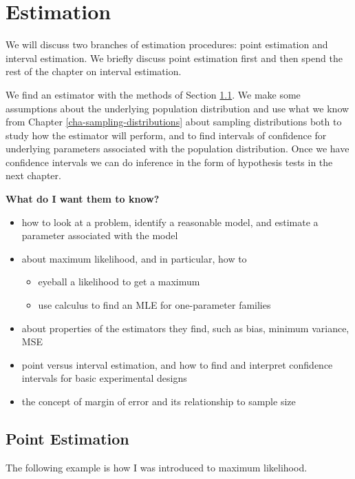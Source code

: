 \documentclass[]{book}
\providecommand{\tightlist}{%
  \setlength{\itemsep}{0pt}\setlength{\parskip}{0pt}}
\numberwithin{equation}{chapter}
\numberwithin{figure}{chapter}
\theoremstyle{plain}
\theoremstyle{definition}
\theoremstyle{remark}
\theoremstyle{definition}
\theoremstyle{definition}
\theoremstyle{remark}
\begin{document}
\chapter{Estimation}\label{cha-estimation}

We will discuss two branches of estimation procedures: point estimation
and interval estimation. We briefly discuss point estimation first and
then spend the rest of the chapter on interval estimation.

We find an estimator with the methods of Section
\ref{sec-point-estimation}. We make some assumptions about the
underlying population distribution and use what we know from Chapter
\ref{cha-sampling-distributions} about sampling distributions both to
study how the estimator will perform, and to find intervals of
confidence for underlying parameters associated with the population
distribution. Once we have confidence intervals we can do inference in
the form of hypothesis tests in the next chapter.

\textbf{What do I want them to know?}

\begin{itemize}
\tightlist
\item
  how to look at a problem, identify a reasonable model, and estimate a
  parameter associated with the model
\item
  about maximum likelihood, and in particular, how to

  \begin{itemize}
  \tightlist
  \item
    eyeball a likelihood to get a maximum
  \item
    use calculus to find an MLE for one-parameter families
  \end{itemize}
\item
  about properties of the estimators they find, such as bias, minimum
  variance, MSE
\item
  point versus interval estimation, and how to find and interpret
  confidence intervals for basic experimental designs
\item
  the concept of margin of error and its relationship to sample size
\end{itemize}

\section{Point Estimation}\label{sec-point-estimation}

The following example is how I was introduced to maximum likelihood.
\end{document}
